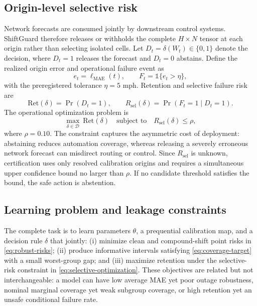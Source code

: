 \documentclass[preprint,12pt]{elsarticle}
\begin{document}
\subsection{Origin-level selective risk}
Network forecasts are consumed jointly by downstream control systems.
ShiftGuard therefore releases or withholds the complete $H\times N$ tensor at
each origin rather than selecting isolated cells. Let
$D_t=\delta(W_t)\in\{0,1\}$ denote the decision, where $D_t=1$ releases the
forecast and $D_t=0$ abstains. Define the realized origin error and operational
failure event as
\begin{equation}
 e_t=\ell_{\mathrm{MAE}}(t),\qquad
 F_t=\mathbb{1}\{e_t>\eta\},
 \label{eq:origin-failure}
\end{equation}
with the preregistered tolerance $\eta=5$ mph. Retention and selective failure
risk are
\begin{equation}
 \mathrm{Ret}(\delta)=\Pr(D_t=1),\qquad
 R_{\mathrm{sel}}(\delta)=\Pr(F_t=1\mid D_t=1).
 \label{eq:selective-risk}
\end{equation}
The operational optimization problem is
\begin{equation}
 \max_{\delta\in\mathcal{D}}\ \mathrm{Ret}(\delta)
 \quad\text{subject to}\quad
 R_{\mathrm{sel}}(\delta)\leq\rho,
 \label{eq:selective-optimization}
\end{equation}
where $\rho=0.10$. The constraint captures the asymmetric cost of deployment:
abstaining reduces automation coverage, whereas releasing a severely erroneous
network forecast can misdirect routing or control. Since $R_{\mathrm{sel}}$ is
unknown, certification uses only resolved calibration origins and requires a
simultaneous upper confidence bound no larger than $\rho$. If no candidate
threshold satisfies the bound, the safe action is abstention.

\subsection{Learning problem and leakage constraints}
The complete task is to learn parameters $\theta$, a prequential calibration
map, and a decision rule $\delta$ that jointly: (i) minimize clean and
compound-shift point risks in \cref{eq:robust-risks}; (ii) produce informative
intervals satisfying \cref{eq:coverage-target} with a small worst-group gap;
and (iii) maximize retention under the selective-risk constraint in
\cref{eq:selective-optimization}. These objectives are related but not
interchangeable: a model can have low average MAE yet poor outage robustness,
nominal marginal coverage yet weak subgroup coverage, or high retention yet an
unsafe conditional failure rate.
\end{document}
